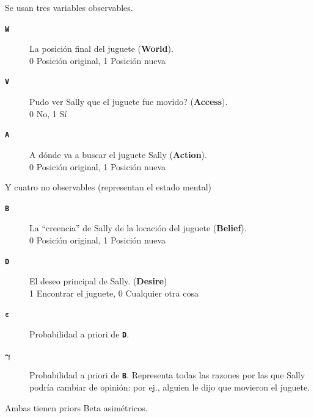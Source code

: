 \documentclass{beamer}
\begin{document}
\begin{frame}
\vspace{1em}
Se usan tres variables observables.
\begin{description}
	\item[\texttt{\textbf{W}}] La posición final del juguete (\textbf{World}).  \\
		0 \textrightarrow{}  Posición original, 1 \textrightarrow{}  Posición nueva

	\item[\texttt{\textbf{V}}] Pudo ver Sally que el juguete fue movido? (\textbf{Access}). \\
		0 \textrightarrow{}  No, 1 \textrightarrow{}  Sí

	\item[\texttt{\textbf{A}}] A dónde va a buscar el juguete Sally (\textbf{Action}). \\
		0 \textrightarrow{}  Posición original, 1 \textrightarrow{}  Posición nueva
\end{description}

Y cuatro no observables (representan el estado mental)
\begin{description}
	\item[\texttt{\textbf{B}}] La ``creencia'' de Sally de la locación del juguete (\textbf{Belief}). \\
		0 \textrightarrow{} Posición original, 1 \textrightarrow{} Posición nueva
	
	\item[\texttt{\textbf{D}}] El deseo principal de Sally. (\textbf{Desire}) \\
		1 \textrightarrow{}  Encontrar el juguete, 0 \textrightarrow{}  Cualquier otra cosa

\end{description}
\end{frame}

\begin{frame}
\begin{description}
	\item[\(\boldsymbol{\varepsilon}\)] Probabilidad a priori de \texttt{\textbf{D}}.
	\item[\(\boldsymbol{\gamma}\)] Probabilidad a priori de \texttt{\textbf{B}}. Representa todas las razones por las que Sally podría cambiar de opinión: por ej., alguien le dijo que movieron el juguete.
\end{description}

Ambas tienen priors Beta asimétricos.
\end{frame}
\end{document}
